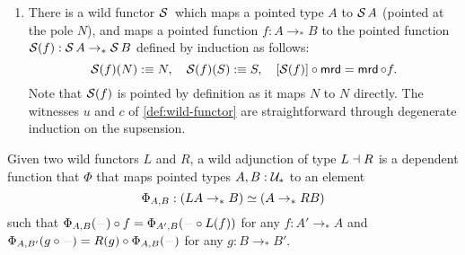 \documentclass[english,a4]{article}
\renewcommand{\ap}[1]{\left[{#1}\right]}
\newcommand{\ptdto}{\to_\ast}%
\newcommand{\UUptd}{\UU_{\ast}}
\begin{document}
\begin{example}
\begin{enumerate}
    \item There is a wild functor $\susp \null$ which maps a pointed type $A$
      to $\operatorname{\mathcal S} A$ (pointed at the pole $N$), and maps a pointed function
      $f:A\ptdto B$ to the pointed function $\susp (f) : \susp A \ptdto \susp
      B$ defined by induction as follows:
      \begin{displaymath}
        \susp (f) (N) \defequi N,\quad
        \susp (f) (S) \defequi S,\quad
        \ap{\susp (f)} \circ \mrd = \mrd \circ f.
      \end{displaymath}
      Note that $\operatorname{\mathcal S} (f)$ is pointed by definition as it maps $N$ to $N$
      directly. The witnesses $u$ and $c$ of \cref{def:wild-functor} are
      straightforward through degenerate induction on the supsension.
  \end{enumerate}
\end{example}

\begin{definition}
  Given two wild functors $L$ and $R$, a wild adjunction of type $L\dashv
  R$ is a dependent function that $\Phi$ that maps pointed types $A,B:\UUptd$
  to an element
  \begin{displaymath}
    \Phi_{A,B} : (LA\ptdto B) \weq (A\ptdto RB)
  \end{displaymath}
  such that $\Phi_{A,B}(\blank) \circ f = \Phi_{A',B} (\blank \circ L(f))$ for
  any $f:A'\ptdto A$ and $\Phi_{A,B'}(g\circ\blank) = R(g)\circ \Phi_{A,B}
  (\blank)$ for any $g:B\ptdto B'$.
  \label{def:wild-adj}
\end{definition}



\end{document}
